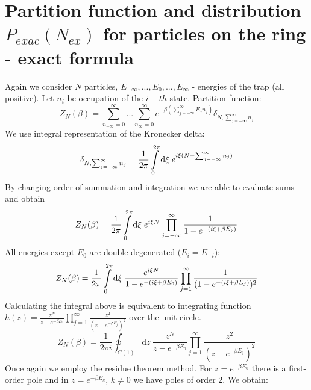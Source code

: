 \documentclass{article}
\begin{document}
\section{Partition function and distribution $P_{exac}(N_{ex})$ for particles on the ring - exact formula}
Again we consider $N$ particles, $E_{-\infty},...,E_0,...,E_{\infty}$ - energies of the trap (all positive). Let $n_i$ be occupation of the $i-th$ state. Partition function:
\begin{equation*}
    Z_N(\beta)=\sum_{n_{-\infty}=0}^{\infty}...\sum_{n_{\infty}=0}^{\infty} e^{-\beta(\sum_{j=-\infty}^{\infty}E_j n_j)} \delta_{N,\sum_{j=-\infty}^{\infty}n_j}
\end{equation*}
We use  integral representation of the Kronecker delta:
\begin{equation*}
    \delta_{N,\sum_{j=-\infty}^{\infty}n_j}=\frac{1}{2\pi} \int\displaylimits_0^{2\pi} \mathrm{d} \xi \; e^{i \xi (N-\sum_{j=-\infty}^{\infty}n_j)}
\end{equation*}
By changing order of summation and integration we are able to evaluate sums and obtain
\begin{equation*}
    Z_N(\beta)=\frac{1}{2\pi} \int\displaylimits_0^{2\pi} \mathrm{d} \xi \; e^{i \xi N} \prod_{j=-\infty}^{\infty} \frac{1}{1-e^{-(i \xi + \beta E_j)}}
\end{equation*}
All energies except $E_0$ are double-degenerated ($E_i=E_{-i}$):
\begin{equation*}
Z_N(\beta)=\frac{1}{2\pi} \int\displaylimits_0^{2\pi} \mathrm{d} \xi \; \frac{e^{i \xi N}}{1-e^{-(i\xi+\beta E_0)}}\prod_{j=1}^{\infty} \frac{1}{(1-e^{-(i \xi + \beta E_j)})^2}
\end{equation*}
Calculating the integral above is equivalent to integrating function $h(z)=\frac{z^N}{z-e^{-\beta E_0}}\prod_{j=1}^{\infty}\frac{z^2}{(z-e^{-\beta E_j})^2}$ over the unit circle.
\begin{equation*}
    Z_N(\beta)=\frac{1}{2 \pi i}\oint_{C(1)} \mathrm{d}z \; \frac{z^N}{z-e^{-\beta E_0}}\prod_{j=1}^{\infty}\frac{z^2}{(z-e^{-\beta E_j})^2}
\end{equation*}
Once again we employ the residue theorem method. For $z=e^{-\beta E_0}$ there is a first-order pole and in $z=e^{-\beta E_k}$, $k \neq 0$ we have poles of order 2. We obtain:
\end{document}
